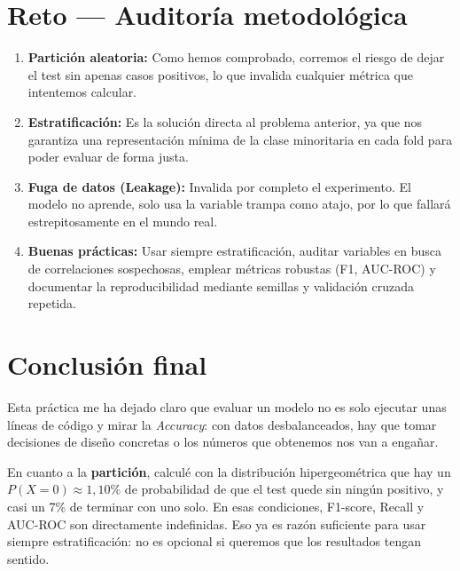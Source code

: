 \documentclass[../../__memoria.tex]{subfiles}
\begin{document}
\section[Reto: Auditoría Metodológica]{Reto --- Auditoría metodológica}

\begin{enumerate}
  \item \textbf{Partición aleatoria:} Como hemos comprobado, corremos el riesgo de dejar el test sin apenas casos positivos, lo que invalida cualquier métrica que intentemos calcular.
  \item \textbf{Estratificación:} Es la solución directa al problema anterior, ya que nos garantiza una representación mínima de la clase minoritaria en cada fold para poder evaluar de forma justa.
  \item \textbf{Fuga de datos (Leakage):} Invalida por completo el experimento. El modelo no aprende, solo usa la variable trampa como atajo, por lo que fallará estrepitosamente en el mundo real.
  \item \textbf{Buenas prácticas:} Usar siempre estratificación, auditar
        variables en busca de correlaciones sospechosas, emplear métricas
        robustas (F1, AUC-ROC) y documentar la reproducibilidad mediante
        semillas y validación cruzada repetida.
\end{enumerate}

\section[Conclusión final]{Conclusión final}

Esta práctica me ha dejado claro que evaluar un modelo no es solo ejecutar
unas líneas de código y mirar la \textit{Accuracy}: con datos desbalanceados,
hay que tomar decisiones de diseño concretas o los números que obtenemos
nos van a engañar.

En cuanto a la \textbf{partición}, calculé con la distribución hipergeométrica
que hay un $P(X=0) \approx 1{,}10\%$ de probabilidad de que el test quede
sin ningún positivo, y casi un 7\% de terminar con uno solo. En esas
condiciones, F1-score, Recall y AUC-ROC son directamente indefinidas.
Eso ya es razón suficiente para usar siempre estratificación: no es
opcional si queremos que los resultados tengan sentido.
\end{document}
